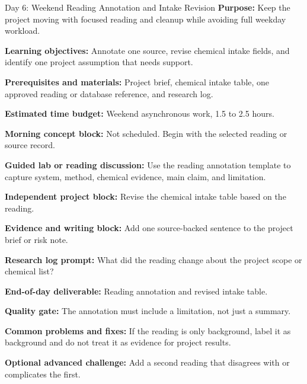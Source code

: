 \begin{dailybox}{Day 6: Weekend Reading Annotation and Intake Revision}
\textbf{Purpose:} Keep the project moving with focused reading and cleanup while avoiding full weekday workload.

\textbf{Learning objectives:} Annotate one source, revise chemical intake fields, and identify one project assumption that needs support.

\textbf{Prerequisites and materials:} Project brief, chemical intake table, one approved reading or database reference, and research log.

\textbf{Estimated time budget:} Weekend asynchronous work, 1.5 to 2.5 hours.

\textbf{Morning concept block:} Not scheduled. Begin with the selected reading or source record.

\textbf{Guided lab or reading discussion:} Use the reading annotation template to capture system, method, chemical evidence, main claim, and limitation.

\textbf{Independent project block:} Revise the chemical intake table based on the reading.

\textbf{Evidence and writing block:} Add one source-backed sentence to the project brief or risk note.

\textbf{Research log prompt:} What did the reading change about the project scope or chemical list?

\textbf{End-of-day deliverable:} Reading annotation and revised intake table.

\textbf{Quality gate:} The annotation must include a limitation, not just a summary.

\textbf{Common problems and fixes:} If the reading is only background, label it as background and do not treat it as evidence for project results.

\textbf{Optional advanced challenge:} Add a second reading that disagrees with or complicates the first.
\end{dailybox}

